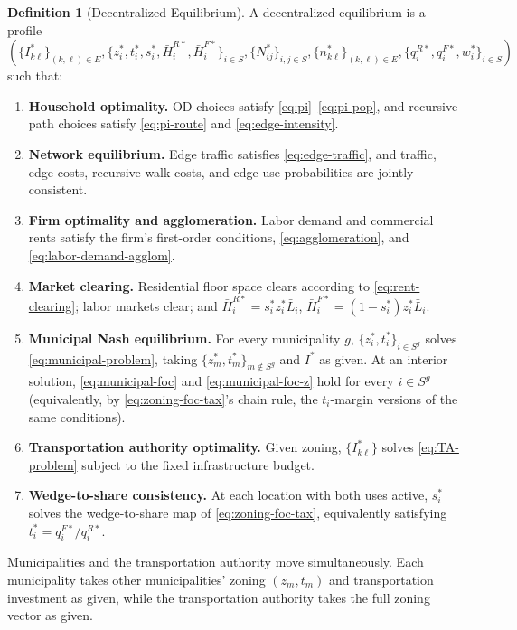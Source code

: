 \documentclass[12pt, a4paper]{article}
\theoremstyle{definition}
\newtheorem{definition}{Definition}
\theoremstyle{remark}
\begin{document}
\begin{definition}[Decentralized Equilibrium]
A decentralized equilibrium is a profile
\[
\left(
\{I_{k\ell}^*\}_{(k,\ell)\in E},
\{z_i^*,t_i^*,s_i^*,\bar H_i^{R*},\bar H_i^{F*}\}_{i\in S},
\{N_{ij}^*\}_{i,j\in S},
\{n_{k\ell}^*\}_{(k,\ell)\in E},
\{q_i^{R*},q_i^{F*},w_i^*\}_{i\in S}
\right)
\]
such that:
\begin{enumerate}
    \item \textbf{Household optimality.} OD choices satisfy \eqref{eq:pi}--\eqref{eq:pi-pop}, and recursive path choices satisfy \eqref{eq:pi-route} and \eqref{eq:edge-intensity}.
    \item \textbf{Network equilibrium.} Edge traffic satisfies \eqref{eq:edge-traffic}, and traffic, edge costs, recursive walk costs, and edge-use probabilities are jointly consistent.
    \item \textbf{Firm optimality and agglomeration.} Labor demand and commercial rents satisfy the firm's first-order conditions, \eqref{eq:agglomeration}, and \eqref{eq:labor-demand-agglom}.
    \item \textbf{Market clearing.} Residential floor space clears according to \eqref{eq:rent-clearing}; labor markets clear; and $\bar H_i^{R*}=s_i^*z_i^*\bar L_i$, $\bar H_i^{F*}=(1-s_i^*)z_i^*\bar L_i$.
    \item \textbf{Municipal Nash equilibrium.} For every municipality $g$, $\{z_i^*,t_i^*\}_{i\in S^g}$ solves \eqref{eq:municipal-problem}, taking $\{z_m^*,t_m^*\}_{m\notin S^g}$ and $I^*$ as given. At an interior solution, \eqref{eq:municipal-foc} and \eqref{eq:municipal-foc-z} hold for every $i\in S^g$ (equivalently, by \eqref{eq:zoning-foc-tax}'s chain rule, the $t_i$-margin versions of the same conditions).
    \item \textbf{Transportation authority optimality.} Given zoning, $\{I_{k\ell}^*\}$ solves \eqref{eq:TA-problem} subject to the fixed infrastructure budget.
    \item \textbf{Wedge-to-share consistency.} At each location with both uses active, $s_i^*$ solves the wedge-to-share map of \eqref{eq:zoning-foc-tax}, equivalently satisfying $t_i^*=q_i^{F*}/q_i^{R*}$.
\end{enumerate}
Municipalities and the transportation authority move simultaneously. Each municipality takes other municipalities' zoning $(z_m,t_m)$ and transportation investment as given, while the transportation authority takes the full zoning vector as given.
\end{definition}
\end{document}

